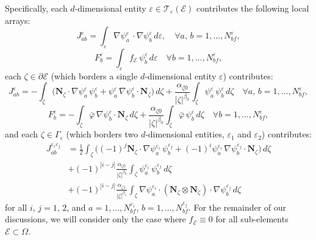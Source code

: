 	Specifically, each $d$-dimensional entity $\varepsilon \in \mathcal{T}_\varepsilon (\mathcal{E})$ contributes the following local arrays:
	\begin{equation}
			J^{\varepsilon}_{ab} = \int_{\varepsilon} \nabla \psi_a^{\varepsilon} \, \cdot \nabla \psi_b^{\varepsilon} \, d \varepsilon, \quad \forall a, \, b = 1, \ldots, N^{\varepsilon}_{bf},
	\end{equation}
	\begin{equation}
			F^{\varepsilon}_b = \int_{\varepsilon} f_{\mathcal{E}} \, \psi_b^{\varepsilon} \, d \varepsilon \quad \forall b = 1, \ldots, N^{\varepsilon}_{bf},
	\end{equation}
	each $\zeta \in \partial \mathcal{E}$ (which borders a single $d$-dimensional entity $\varepsilon$) contributes:
	\begin{equation}
			J^{\varepsilon}_{ab} = - \int_{\zeta} \bigg( \mathbf{N}_{\zeta} \cdot \nabla \psi^{\varepsilon}_a \, \psi^{\varepsilon}_b + \psi^{\varepsilon}_a \, \nabla \psi^{\varepsilon}_b \cdot \mathbf{N}_{\zeta} \bigg) \, d \zeta + \frac{\alpha_{\zeta0}}{|\zeta|^{\beta_0}} \int_{\zeta} \psi_a^{\varepsilon} \, \psi_b^{\varepsilon} \, d \zeta \quad \forall a, \, b = 1, \ldots, N^{\varepsilon}_{bf},
	\end{equation}
	\begin{equation}
		F^{\varepsilon}_b = - \int_{\zeta} \bar{\varphi} \, \nabla \psi_b^{\varepsilon} \cdot \mathbf{N}_{\zeta} \, d \zeta + \frac{\alpha_{\zeta0}}{|\zeta|^{\beta_0}} \int_{\zeta} \bar{\varphi} \, \psi_b^{\varepsilon} \, d \zeta \quad \forall b = 1, \ldots, N^{\varepsilon}_{bf},
		\label{eq:boundary_term}
	\end{equation}
	and each $\zeta \in \Gamma_\varepsilon$ (which borders two $d$-dimensional entities, $\varepsilon_1$ and $\varepsilon_2$) contributes:
	\begin{align}
			J^{\varepsilon_i \varepsilon_j}_{ab} & = \frac{1}{2} \int_{\zeta} \bigg( (-1)^{j} \mathbf{N}_{\zeta} \cdot \nabla \psi_a^{\varepsilon_i} \, \psi_b^{\varepsilon_j} + (-1)^{i} \psi_a^{\varepsilon_i} \, \nabla \psi_b^{\varepsilon_j} \cdot \mathbf{N}_{\zeta} \bigg) \, d \zeta \\
			& + (-1)^{|i-j|} \frac{\alpha_{\zeta0}}{|\zeta|^{\beta_0}} \int_{\zeta} \psi_a^{\varepsilon_i} \, \psi_b^{\varepsilon_j} \, d \zeta \\
			& + (-1)^{|i-j|} \frac{\alpha_{\zeta1}}{|\zeta|^{\beta_1}} \int_{\zeta} \nabla \psi_a^{\varepsilon_i} \cdot (\mathbf{N}_\zeta \otimes \mathbf{N}_\zeta) \cdot \nabla \psi_b^{\varepsilon_j} \, d \zeta
	\end{align}
	for all $i, \, j = 1, \, 2$, and $a = 1, \ldots, N^{\varepsilon_i}_{bf}$, $b = 1, \ldots, N^{\varepsilon_j}_{bf}$. For the remainder of our discussions, we will consider only the case where $f_\mathcal{E} \equiv 0$ for all sub-elements $\mathcal{E} \subset \Omega$.
	
